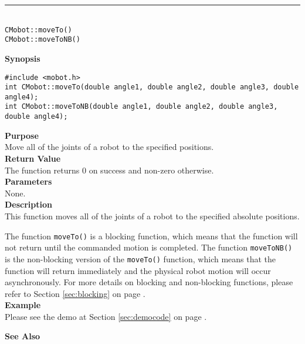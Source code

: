 \noindent
\vspace{5pt}
\rule{4.5in}{0.015in}\\
\noindent
{\LARGE \texttt{CMobot::moveTo()}}\\
{\LARGE \texttt{CMobot::moveToNB()}}\\
{}

\noindent
{\bf Synopsis}\\
\begin{verbatim}
#include <mobot.h>
int CMobot::moveTo(double angle1, double angle2, double angle3, double angle4);
int CMobot::moveToNB(double angle1, double angle2, double angle3, double angle4);
\end{verbatim}

\noindent
{\bf Purpose}\\
Move all of the joints of a robot to the specified positions.\\

\noindent
{\bf Return Value}\\
The function returns 0 on success and non-zero otherwise.\\

\noindent
{\bf Parameters}\\
None.\\

\noindent
{\bf Description}\\
This function moves all of the joints of a robot to the specified absolute positions. 

The function \texttt{moveTo()} is a blocking function, which means that 
the function will not return until the commanded motion is 
completed. The function \texttt{moveToNB()} is the non-blocking version of
the \texttt{moveTo()} function, which means that the function will return
immediately and the physical robot motion will occur asynchronously. For
more details on blocking and non-blocking functions, please refer to 
Section \ref{sec:blocking} on page \pageref{sec:blocking}.\\

\noindent
{\bf Example}\\
Please see the demo at Section \ref{sec:democode} on page \pageref{sec:democode}.\\
\noindent

\noindent
{\bf See Also}\\

